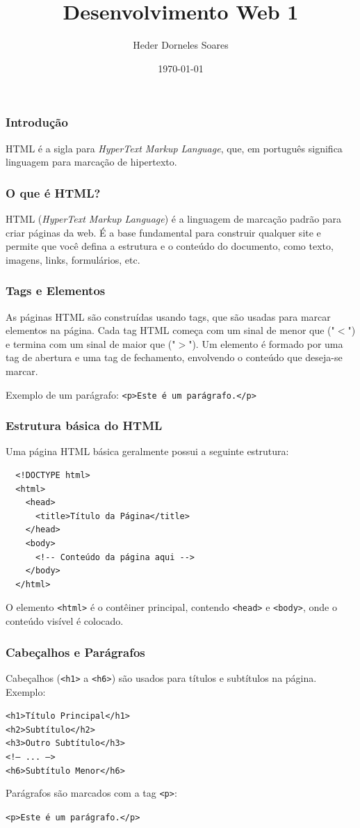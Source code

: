 \documentclass{beamer}
\author{Heder Dorneles Soares}
\title{Desenvolvimento Web 1}
\institute{IFSP}
\date{\today}
\begin{document}
\begin{frame}
  \titlepage
\end{frame}



\begin{frame}
  \frametitle{Introdução}
  HTML é a sigla para \textit{HyperText Markup Language}, que, em português significa linguagem para marcação de hipertexto.
\end{frame}

\begin{frame}
  \frametitle{O que é HTML?}
  HTML (\textit{HyperText Markup Language}) é a linguagem de marcação padrão para criar páginas da web. É a base fundamental para construir qualquer site e permite que você defina a estrutura e o conteúdo do documento, como texto, imagens, links, formulários, etc.
\end{frame}

\begin{frame}
  \frametitle{Tags e Elementos}
  As páginas HTML são construídas usando tags, que são usadas para marcar elementos na página. Cada tag HTML começa com um sinal de menor que ("\(<\)") e termina com um sinal de maior que ("\(>\)"). Um elemento é formado por uma tag de abertura e uma tag de fechamento, envolvendo o conteúdo que deseja-se marcar.

  Exemplo de um parágrafo:
  \texttt{<p>Este é um parágrafo.</p>}
\end{frame}

\begin{frame}[fragile] %
  \frametitle{Estrutura básica do HTML}
  Uma página HTML básica geralmente possui a seguinte estrutura:

  \begin{verbatim}
  <!DOCTYPE html>
  <html>
    <head>
      <title>Título da Página</title>
    </head>
    <body>
      <!-- Conteúdo da página aqui -->
    </body>
  </html>
  \end{verbatim}

  O elemento \texttt{<html>} é o contêiner principal, contendo \texttt{<head>} e \texttt{<body>}, onde o conteúdo visível é colocado.
\end{frame}

\begin{frame}
  \frametitle{Cabeçalhos e Parágrafos}
  Cabeçalhos (\texttt{<h1>} a \texttt{<h6>}) são usados para títulos e subtítulos na página. Exemplo:

  \texttt{<h1>Título Principal</h1>}\\
  \texttt{<h2>Subtítulo</h2>}\\
  \texttt{<h3>Outro Subtítulo</h3>}\\
  \texttt{<!-- ... -->}\\
  \texttt{<h6>Subtítulo Menor</h6>}

  Parágrafos são marcados com a tag \texttt{<p>}:

  \texttt{<p>Este é um parágrafo.</p>}
\end{frame}
\end{document}
